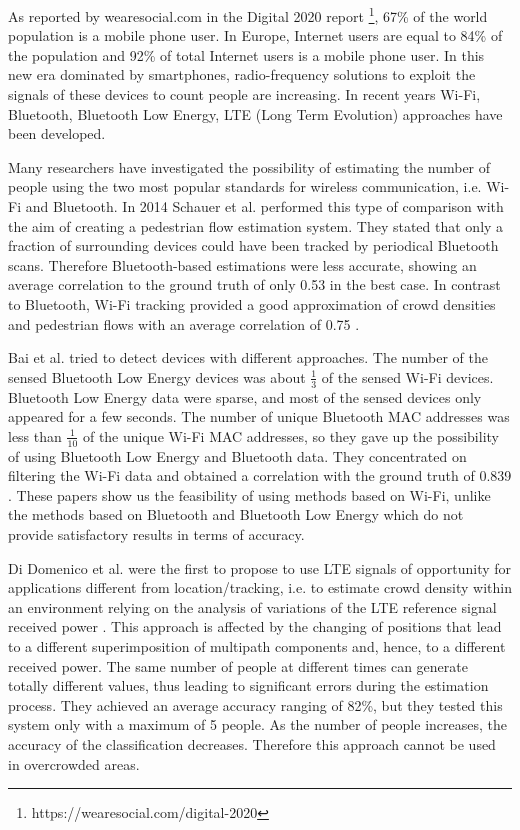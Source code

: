 As reported by wearesocial.com in the Digital 2020 report \footnote{https://wearesocial.com/digital-2020}, 67\% of the world population is a  mobile phone user. In Europe, Internet users are equal to 84\% of the population and 92\% of total Internet users is a mobile phone user. In this new era dominated by smartphones, radio-frequency solutions to exploit the signals of these devices to count people are increasing. In recent years Wi-Fi, Bluetooth, Bluetooth Low Energy, LTE (Long Term Evolution) approaches have been developed.

Many researchers have investigated the possibility of estimating the number of people using the two most popular standards for wireless communication, i.e. Wi-Fi and Bluetooth. In 2014 Schauer et al. performed this type of comparison with the aim of creating a pedestrian flow estimation system. They stated that only a fraction of surrounding devices could have been tracked by periodical Bluetooth scans. Therefore Bluetooth-based estimations were less accurate, showing an average correlation to the ground truth of only 0.53 in the best case. In contrast to Bluetooth, Wi-Fi tracking provided a good approximation of crowd densities and pedestrian flows with an average correlation of 0.75 \cite{schauer2014estimating}.

Bai et al. tried to detect devices with different approaches. The number of the sensed Bluetooth Low Energy devices was about $\frac{1}{3}$ of the sensed Wi-Fi devices. Bluetooth Low Energy data were sparse, and most of the sensed devices only appeared for a few seconds. The number of unique Bluetooth MAC addresses was less than $\frac{1}{10}$ of the unique Wi-Fi MAC addresses, so they gave up the possibility of using Bluetooth Low Energy and Bluetooth data. They concentrated on filtering the Wi-Fi data and obtained a correlation with the ground truth of 0.839 \cite{bai2017lessons}.
These papers show us the feasibility of using methods based on Wi-Fi, unlike the methods based on Bluetooth and Bluetooth Low Energy which do not provide satisfactory results in terms of accuracy.

Di Domenico et al. were the first to propose to use LTE signals of opportunity for applications different from location/tracking, i.e. to estimate crowd density within an environment relying on the analysis of variations of the LTE reference signal received power \cite{di2017lte}. This approach is affected by the changing of positions that lead to a different superimposition of multipath components and, hence, to a different received power. The same number of people at different times can generate totally different values, thus leading to significant errors during the estimation process. They achieved an average accuracy ranging of 82\%, but they tested this system only with a maximum of 5 people. As the number of people increases, the accuracy of the classification decreases. Therefore this approach cannot be used in overcrowded areas.

